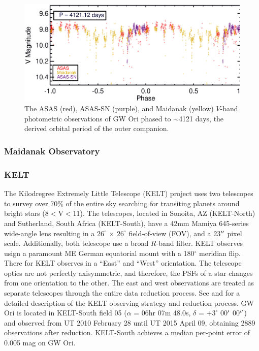 \documentclass[twocolumn]{aastex61}
\begin{document}
\begin{figure}[!ht]
\vspace{0.3in}
\centering\includegraphics[width=0.99\linewidth, trim = 0 5.8in 0 0.3in]{FULL_Phased_LC.eps}
\caption{The ASAS (red), ASAS-SN (purple), and Maidanak (yellow) $V$-band photometric observations of GW Ori phased to $\sim$4121 days, the derived orbital period of the outer companion.}
\label{figure:FullPhasedLC}
\end{figure}

\subsubsection{Maidanak Observatory}

\subsubsection{KELT}
The Kilodregree Extremely Little Telescope (KELT) project uses two telescopes to survey over 70\% of the entire sky searching for transiting planets around bright stars (8$<$V$<$11). The telescopes, located in Sonoita, AZ (KELT-North) and Sutherland, South Africa (KELT-South), have a 42mm Mamiya 645-series wide-angle lens resulting in a $26^{\circ}$ $\times$ $26^{\circ}$ field-of-view (FOV), and a 23$\mbox{$^{\prime\prime}$}$ pixel scale. Additionally, both telescope use a broad $R$-band filter. KELT observes usign a paramount ME German equatorial mount with a 180$^{\circ}$ meridian flip. There for KELT observes in a ``East'' and ``West'' orientation. The telescope optics are not perfectly axisymmetric, and therefore, the PSFs of a star changes from one orientation to the other. The east and west observations are treated as separate telescopes through the entire data reduction process. See \citet{Siverd12} and \citet{Kuhn16} for a detailed description of the KELT observing strategy and reduction process. GW Ori is located in KELT-South field 05 ($\alpha$ =  06hr 07m 48.0s, $\delta$ = $+3^{\circ}$ 00$\mbox{$^\prime$}$ 00$\mbox{$^{\prime\prime}$}$) and observed from UT 2010 February 28 until UT 2015 April 09, obtaining 2889 observations after reduction. KELT-South achieves a median per-point error of 0.005 mag on GW Ori.
\end{document}
